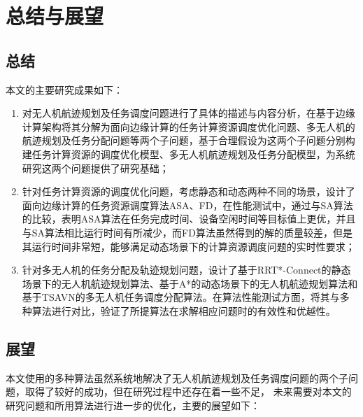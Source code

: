 \chapter{总结与展望}

\section{总结}

本文的主要研究成果如下：

\begin{enumerate}[leftmargin=2em]
    \item {对无人机航迹规划及任务调度问题进行了具体的描述与内容分析，在基于边缘计算架构将其分解为面向边缘计算的任务计算资源调度优化问题、多无人机的航迹规划及任务分配问题等两个子问题，基于合理假设为这两个子问题分别构建任务计算资源的调度优化模型、多无人机航迹规划及任务分配模型，为系统研究这两个问题提供了研究基础；}

    \item {针对任务计算资源的调度优化问题，考虑静态和动态两种不同的场景，设计了面向边缘计算的任务资源调度算法ASA、FD，在性能测试中，通过与SA算法的比较，表明ASA算法在任务完成时间、设备空闲时间等目标值上更优，并且与SA算法相比运行时间有所减少，而FD算法虽然得到的解的质量较差，但是其运行时间非常短，能够满足动态场景下的计算资源调度问题的实时性要求；}

    \item {针对多无人机的任务分配及轨迹规划问题，设计了基于RRT*-Connect的静态场景下的无人机航迹规划算法、基于A*的动态场景下的无人机航迹规划算法和基于TSAVN的多无人机任务调度分配算法。在算法性能测试方面，将其与多种算法进行对比，验证了所提算法在求解相应问题时的有效性和优越性。}
\end{enumerate}

\section{展望}

本文使用的多种算法虽然系统地解决了无人机航迹规划及任务调度问题的两个子问题，取得了较好的成功，但在研究过程中还存在着一些不足，
未来需要对本文的研究问题和所用算法进行进一步的优化，主要的展望如下：

